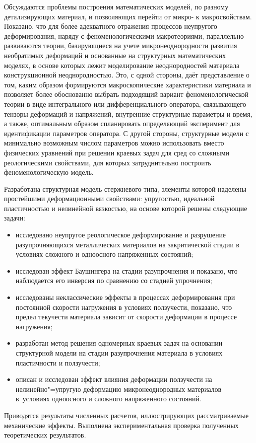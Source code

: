 {
\small

                          
Обсуждаются проблемы построения математических моделей, по разному
детализирующих материал, и позволяющих перейти от микро- к макросвойствам. 
Показано, что для более адекватного отражения процессов неупругого деформирования, 
наряду с феноменологическими макротеориями, параллельно развиваются теории, 
базирующиеся на учете микронеоднородности развития необратимых деформаций 
и основанные на структурных математических моделях, в основе которых лежит 
моделирование неоднородностей материала конструкционной неоднородностью.
Это, с одной стороны,
даёт представление о том, каким образом формируются макроскопические
характеристики материала и позволяет более обоснованно выбрать подходящий 
вариант феноменологической теории в виде интегрального или дифференциального
 оператора, связывающего тензоры деформаций и напряжений,
внутренние структурные параметры и время, а также, оптимальным образом
спланировать определяющий эксперимент для идентификации параметров
оператора. С другой стороны, структурные модели с минимально возможным 
числом параметров можно использовать вместо физических уравнений
при решении краевых задач для сред со сложными реологическими свойствами, для которых затруднительно построить феноменологическую модель.

Разработана структурная модель стержневого типа, элементы которой наделены 
простейшими деформационными свойствами: упругостью, идеальной
пластичностью и нелинейной вязкостью, на основе которой решены следующие задачи:
\begin{itemize}
\item[--] исследовано неупругое реологическое деформирование и разрушение
     разупрочняющихся металлических материалов на закритической стадии в условиях сложного и одноосного напряженных состояний;
\item[--] исследован эффект Баушингера на стадии разупрочнения и показано,
     что наблюдается его инверсия по сравнению со стадией упрочнения;
\item[--] исследованы неклассические эффекты в процессах деформирования при
          постоянной скорости нагружения в условиях ползучести, показано, что
     предел текучести материала зависит от скорости деформации в процессе нагружения;
\item[--] разработан метод решения одномерных краевых задач на основании
     структурной модели на стадии разупрочнения материала в условиях
     пластичности и ползучести;
\item[--] описан и исследован эффект влияния деформации ползучести на нелинейно"=упругую деформацию микронеоднородных материалов в~условиях одноосного и сложного напряженного состояний.
\end{itemize}

   Приводятся результаты численных расчетов, иллюстрирующих рассматриваемые механические эффекты. Выполнена экспериментальная проверка
полученных теоретических результатов.

}

